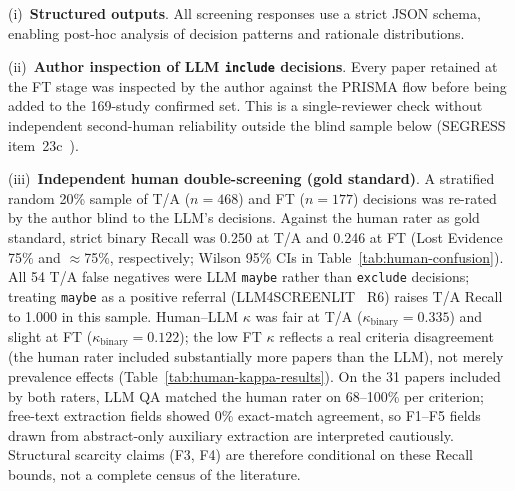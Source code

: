 (i)~\textbf{Structured outputs}. All screening responses use a strict JSON
schema, enabling post-hoc analysis of decision patterns and rationale
distributions.

(ii)~\textbf{Author inspection of LLM \texttt{include} decisions}.
Every paper retained at the FT stage was inspected by the author against the
PRISMA flow before being added to the 169-study confirmed set. This is a
single-reviewer check without independent second-human reliability outside
the blind sample below (SEGRESS item~23c~\cite{kitchenham2023segress}).

(iii)~\textbf{Independent human double-screening (gold standard)}.
A stratified random 20\% sample of T/A ($n=468$) and FT ($n=177$) decisions
was re-rated by the author blind to the LLM's decisions. Against the human
rater as gold standard, strict binary Recall was 0.250 at T/A and 0.246 at
FT (Lost Evidence 75\% and $\approx$75\%, respectively; Wilson 95\% CIs in
Table~\ref{tab:human-confusion}). All 54 T/A false negatives were LLM
\texttt{maybe} rather than \texttt{exclude} decisions; treating
\texttt{maybe} as a positive referral (LLM4SCREENLIT~\cite{llm4screenlit2025}
R6) raises T/A Recall to 1.000 in this sample. Human--LLM $\kappa$ was fair
at T/A ($\kappa_{\text{binary}}=0.335$) and slight at FT
($\kappa_{\text{binary}}=0.122$); the low FT $\kappa$ reflects a real
criteria disagreement (the human rater included substantially more papers
than the LLM), not merely prevalence effects
(Table~\ref{tab:human-kappa-results}). On the 31 papers included by both
raters, LLM QA matched the human rater on 68--100\% per criterion; free-text
extraction fields showed 0\% exact-match agreement, so F1--F5 fields drawn
from abstract-only auxiliary extraction are interpreted cautiously.
Structural scarcity claims (F3, F4) are therefore conditional on these Recall
bounds, not a complete census of the literature.




